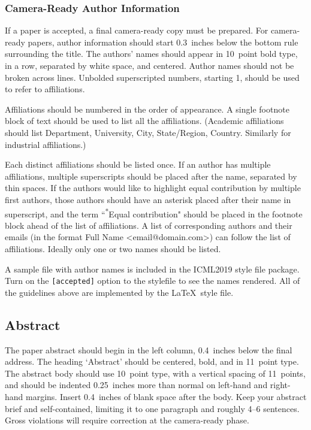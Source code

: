 \documentclass{article}
\begin{document}
\subsubsection{Camera-Ready Author Information}
\label{final author}

If a paper is accepted, a final camera-ready copy must be prepared.
%
For camera-ready papers, author information should start 0.3~inches below the
bottom rule surrounding the title. The authors' names should appear in 10~point
bold type, in a row, separated by white space, and centered. Author names should
not be broken across lines. Unbolded superscripted numbers, starting 1, should
be used to refer to affiliations.

Affiliations should be numbered in the order of appearance. A single footnote
block of text should be used to list all the affiliations. (Academic
affiliations should list Department, University, City, State/Region, Country.
Similarly for industrial affiliations.)

Each distinct affiliations should be listed once. If an author has multiple
affiliations, multiple superscripts should be placed after the name, separated
by thin spaces. If the authors would like to highlight equal contribution by
multiple first authors, those authors should have an asterisk placed after their
name in superscript, and the term ``\textsuperscript{*}Equal contribution"
should be placed in the footnote block ahead of the list of affiliations. A
list of corresponding authors and their emails (in the format Full Name
\textless{}email@domain.com\textgreater{}) can follow the list of affiliations.
Ideally only one or two names should be listed.

A sample file with author names is included in the ICML2019 style file
package. Turn on the \texttt{[accepted]} option to the stylefile to
see the names rendered. All of the guidelines above are implemented
by the \LaTeX\ style file.

\subsection{Abstract}

The paper abstract should begin in the left column, 0.4~inches below the final
address. The heading `Abstract' should be centered, bold, and in 11~point type.
The abstract body should use 10~point type, with a vertical spacing of
11~points, and should be indented 0.25~inches more than normal on left-hand and
right-hand margins. Insert 0.4~inches of blank space after the body. Keep your
abstract brief and self-contained, limiting it to one paragraph and roughly 4--6
sentences. Gross violations will require correction at the camera-ready phase.
\end{document}
